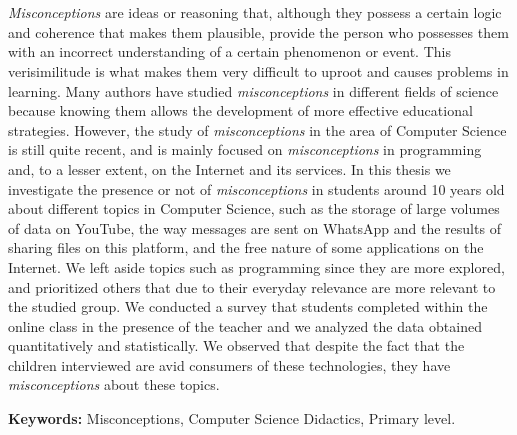 \chapter*{\runtitle}

\noindent  \textit{Misconceptions} are ideas or reasoning that, although they possess a certain logic and coherence that makes them plausible, provide the person who possesses them with an incorrect understanding of a certain phenomenon or event. This verisimilitude is what makes them very difficult to uproot and causes problems in learning. Many authors have studied \textit{misconceptions} in different fields of science because knowing them allows the development of more effective educational strategies. However, the study of \textit{misconceptions} in the area of Computer Science is still quite recent, and is mainly focused on \textit{misconceptions} in programming and, to a lesser extent, on the Internet and its services. In this thesis we investigate the presence or not of \textit{misconceptions} in students around 10 years old about different topics in Computer Science, such as the storage of large volumes of data on YouTube, the way messages are sent on WhatsApp and the results of sharing files on this platform, and the free nature of some applications on the Internet. We left aside topics such as programming since they are more explored, and prioritized others that due to their everyday relevance are more relevant to the studied group. We conducted a survey that students completed within the online class in the presence of the teacher and we analyzed the data obtained quantitatively and statistically. 
We observed that despite the fact that the children interviewed are avid consumers of these technologies, they have \textit{misconceptions} about these topics.

\bigskip

\noindent\textbf{Keywords:} Misconceptions, Computer Science Didactics, Primary level.